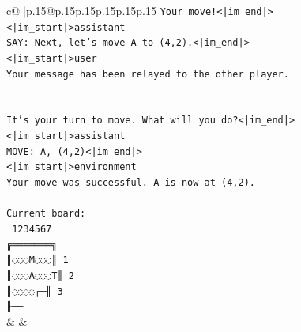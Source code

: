 \documentclass{article}
\begin{document}
{\begin{supertabular}{c@{$\;$}|p{.15\linewidth}@{}p{.15\linewidth}p{.15\linewidth}p{.15\linewidth}p{.15\linewidth}p{.15\linewidth}}
{{{\texttt{Your move!<|im\_end|>} \\
\texttt{<|im\_start|>assistant} \\
\texttt{SAY: Next, let's move A to (4,2).<|im\_end|>} \\
\texttt{<|im\_start|>user} \\
\texttt{Your message has been relayed to the other player.} \\
\\ 
\\ 
\texttt{It's your turn to move. What will you do?<|im\_end|>} \\
\texttt{<|im\_start|>assistant} \\
\texttt{MOVE: A, (4,2)<|im\_end|>} \\
\texttt{<|im\_start|>environment} \\
\texttt{Your move was successful. A is now at (4,2).} \\
\\ 
\texttt{Current board:} \\
\texttt{ 1234567} \\
\texttt{╔═══════╗} \\
\texttt{║◌◌◌M◌◌◌║ 1} \\
\texttt{║◌◌◌A◌◌◌T║ 2} \\
\texttt{║◌◌◌◌┌─╢ 3} \\
\texttt{╟──} \\
            }
        }
    }
    & & \\ \\


\end{supertabular}}
\end{document}

